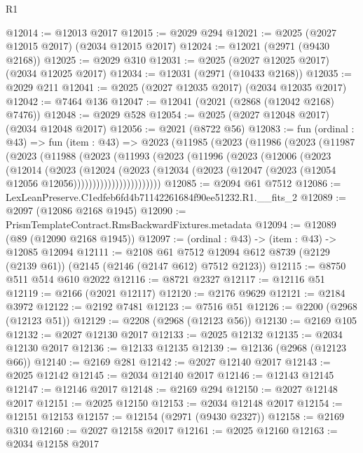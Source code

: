 \begin{lexlean}{R1}
\begin{coremodule}
@12014 := @12013 @2017
@12015 := @2029 @294
@12021 := @2025 (@2027 @12015 @2017) (@2034 @12015 @2017)
@12024 := @12021 (@2971 (@9430 @2168))
@12025 := @2029 @310
@12031 := @2025 (@2027 @12025 @2017) (@2034 @12025 @2017)
@12034 := @12031 (@2971 (@10433 @2168))
@12035 := @2029 @211
@12041 := @2025 (@2027 @12035 @2017) (@2034 @12035 @2017)
@12042 := @7464 @136
@12047 := @12041 (@2021 (@2868 (@12042 @2168) @7476))
@12048 := @2029 @528
@12054 := @2025 (@2027 @12048 @2017) (@2034 @12048 @2017)
@12056 := @2021 (@8722 @56)
@12083 := fun (ordinal : @43) =>
  fun (item : @43) =>
  @2023
    (@11985
      (@2023
        (@11986
          (@2023
            (@11987
              (@2023
                (@11988
                  (@2023
                    (@11993
                      (@2023
                        (@11996
                          (@2023
                            (@12006
                              (@2023
                                (@12014
                                  (@2023
                                    (@12024
                                      (@2023
                                        (@12034
                                          (@2023
                                            (@12047
                                              (@2023 (@12054 @12056 @12056)))))))))))))))))))))))
@12085 := @2094 @61 @7512
@12086 := LexLeanPreserve.C1edfeb6fd4b71142261684f90ee51232.R1.__fits_2
@12089 := @2097 (@12086 @2168 @1945)
@12090 := PrismTemplateContract.RmsBackwardFixtures.metadata
@12094 := @12089 (@89 (@12090 @2168 @1945))
@12097 := (ordinal : @43) -> (item : @43) -> @12085 @12094
@12111 := @2108
    @61
    @7512
    @12094
    @612
    @8739
    (@2129 (@2139 @61))
    (@2145 (@2146 (@2147 @612) @7512 @2123))
@12115 := @8750 @511 @514 @610 @2022
@12116 := @8721 @2327
@12117 := @12116 @51
@12119 := @2166 (@2021 @12117)
@12120 := @2176 @9629
@12121 := @2184 @3972
@12122 := @2192 @7481
@12123 := @7516 @51
@12126 := @2200 (@2968 (@12123 @51))
@12129 := @2208 (@2968 (@12123 @56))
@12130 := @2169 @105
@12132 := @2027 @12130 @2017
@12133 := @2025 @12132
@12135 := @2034 @12130 @2017
@12136 := @12133 @12135
@12139 := @12136 (@2968 (@12123 @66))
@12140 := @2169 @281
@12142 := @2027 @12140 @2017
@12143 := @2025 @12142
@12145 := @2034 @12140 @2017
@12146 := @12143 @12145
@12147 := @12146 @2017
@12148 := @2169 @294
@12150 := @2027 @12148 @2017
@12151 := @2025 @12150
@12153 := @2034 @12148 @2017
@12154 := @12151 @12153
@12157 := @12154 (@2971 (@9430 @2327))
@12158 := @2169 @310
@12160 := @2027 @12158 @2017
@12161 := @2025 @12160
@12163 := @2034 @12158 @2017

\end{coremodule}
\end{lexlean}
